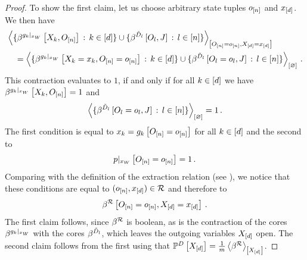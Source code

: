 \begin{proof}
    To show the first claim, let us choose arbitrary state tuples $o_{[n]}$ and $x_{[d]}$.
    We then have
    \begin{align*}
        &\contractionof{
            \{\bencodingofat{\groundingof{\extformulaof{\atomenumerator}}}{\catvariableof{\catenumerator},\shortindvariables} \wcols \catenumeratorin\}
            \cup \{\bencodingofat{\secdatamap_{\indenumerator}}{\indvariableof{\indenumerator},\datvariable} \wcols \indenumeratorin\}
        }{\indexedshortindvariables,\indexedshortcatvariables} \\
        & \quad  =  \contraction{
            \{\bencodingofat{\groundingof{\extformulaof{\atomenumerator}}}{\indexedcatvariableof{\catenumerator},\indexedshortindvariables} \wcols \catenumeratorin\}
            \cup \{\bencodingofat{\secdatamap_{\indenumerator}}{\indexedindvariableof{\indenumerator},\datvariable} \wcols \indenumeratorin\}
        } \, .
    \end{align*}
    This contraction evaluates to $1$, if and only if for all $k\in[d]$ we have $\bencodingofat{\groundingof{\extformulaof{\atomenumerator}}}{\catvariableof{\catenumerator},\shortindvariables}=1$ and
    \begin{align*}
        \contraction{\{\bencodingofat{\secdatamap_{\indenumerator}}{\indexedindvariableof{\indenumerator},\datvariable} \wcols \indenumeratorin\}}  = 1 \, .
    \end{align*}
    The first condition is equal to $x_{k} = g_{k}\left[O_{[n]}=o_{[n]}\right]$ for all $k\in[d]$ and the second to
    \begin{align*}
        {p}|_{x_{W}} \left[O_{[n]}=o_{[n]}\right] = 1 \, .
    \end{align*}
    Comparing with the definition of the extraction relation (see ), we notice that these conditions are equal to $(o_{[n]},x_{[d]})\in\mathcal{R}$ and therefore to
    \begin{align*}
        \bencodingofat{\extractionrelation}{\indexedshortindvariables,\indexedshortcatvariables} \, .
    \end{align*}
    The first claim follows, since $\beta^{\mathcal{R}}$ is boolean, as is the contraction of the cores $\beta^{{g_{k}}|_{x_{W}}}$ with the cores $\beta^{\tilde{D}_{l}}$, which leaves the outgoing variables $X_{[d]}$ open.
    The second claim follows from the first using that $\mathbb{P}^{D}\left[X_{[d]}\right]=\frac{1}{m}\left\langle \beta^{\mathcal{R}}\right\rangle_{\left[ X_{[d]} \right]}$.
\end{proof}

